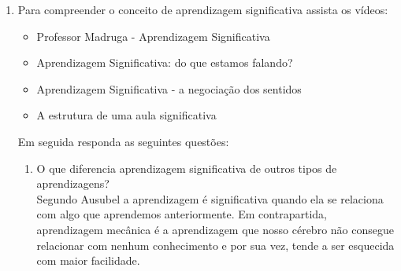 \documentclass[a4paper, 12pt]{article}
\begin{document}
\begin{enumerate}
\item Para compreender o conceito de aprendizagem significativa assista os vídeos:
  \begin{itemize}
  \item Professor Madruga - Aprendizagem Significativa
  \item Aprendizagem Significativa: do que estamos falando?
  \item Aprendizagem Significativa - a negociação dos sentidos
  \item A estrutura de uma aula significativa    
  \end{itemize}

  Em seguida responda as seguintes questões: 
  \begin{enumerate}
  \item O que diferencia aprendizagem significativa de outros tipos de aprendizagens? \\
    Segundo Ausubel a aprendizagem é significativa quando ela se relaciona com algo que aprendemos anteriormente. Em contrapartida, aprendizagem mecânica é a aprendizagem que nosso cérebro não consegue relacionar com nenhum conhecimento e por sua vez, tende a ser esquecida com maior facilidade.
    

\end{enumerate}
\end{enumerate}
\end{document}
